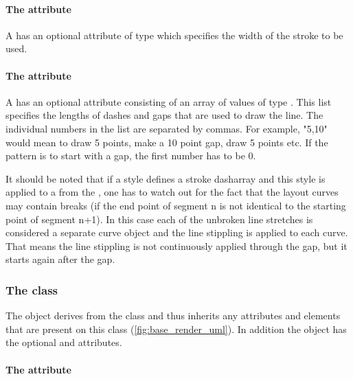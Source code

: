 \paragraph{The \fixttspace{} attribute}

A \GraphicalPrimitiveOneD has an optional attribute 
of type  which specifies the width of the stroke to be used.

\paragraph{The \fixttspace{} attribute}

A \GraphicalPrimitiveOneD has an optional attribute
 consisting of an array of values of type . This list specifies the lengths of dashes and 
gaps that are used to draw the line. The individual numbers in the list are separated by commas. 
For example,  "5,10" would mean to draw 5 points, make a 10 point gap, draw 5 points etc. If the pattern is to start with a gap, the first number has to be 0.

It should be noted that if a style defines a stroke dasharray and this style is applied to a  from the \LayoutPackage, one has to watch out for the fact that the layout curves may contain breaks (if the end point of segment n is not identical to the starting point of segment n+1). In this case each of the unbroken line stretches is considered a separate curve object and the line stippling is applied to each curve. That means the line stippling is not continuously applied through the gap, but it starts again after the gap.


\subsubsection{The  class}
\label{graphicalprimitivetwod-class}

The \GraphicalPrimitiveTwoD object derives from the
\GraphicalPrimitiveOneD class and thus inherits any attributes and
elements that are present on this class (\ref{fig:base_render_uml}).
In addition the \GraphicalPrimitiveTwoD object has the optional  and  attributes.

\paragraph{The \fixttspace{} attribute}

